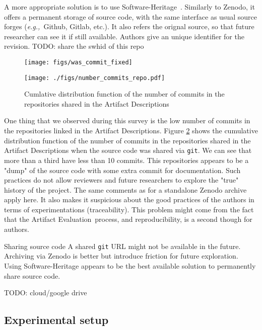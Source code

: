 \documentclass[sigconf]{acmart}
\newcommand{\eg}{\emph{e.g.,}}
\newcommand{\ad}{Artifact Description}
\newcommand{\aeval}{Artifact Evaluation}
\newcommand{\todo}[1]{{\color{red}TODO: #1}}
\begin{document}
A more appropriate solution is to use Software-Heritage\ \cite{swheritage, di2017software}.
Similarly to Zenodo, it offers a permanent storage of source code, with the same interface as usual source forges (\eg\ Github, Gitlab, etc.).
It also refers the orignal source, so that future researcher can see it if still available.
Authors give an unique identifier for the revision. 
\todo{share the swhid of this repo}



\begin{figure}
  \centering
  \texttt{[image: figs/was\_commit\_fixed]}
  \caption{}\label{fig:was_commit_fixed}
\end{figure}

\begin{figure}
  \centering
  \texttt{[image: ./figs/number\_commits\_repo.pdf]}
  \caption{Cumlative distribution function of the number of commits in the repositories shared in the \ad s}\label{fig:number_commits_repo}
\end{figure}

One thing that we observed during this survey is the low number of commits in the repositories linked in the \ad s.
Figure \ref{fig:number_commits_repo} shows the cumulative distribution function of the number of commits in the repositories shared in the \ad s when the source code was shared via \texttt{git}.
We can see that more than a third have less than 10 commits.
This repositories appears to be a "dump" of the source code with some extra commit for documentation.
Such practices do not allow reviewers and future researchers to explore the "true" history of the project.
The same comments as for a standalone Zenodo archive apply here.
It also makes it suspicious about the good practices of the authors in terms of experimentations (traceability).
This problem might come from the fact that the \aeval\ process, and reproducibility, is a second though for authors.

\begin{lesson}{Sharing source code}{}
  A shared \texttt{git} URL might not be available in the future.
  Archiving via Zenodo is better but introduce friction for future exploration.
  Using Software-Heritage appears to be the best available solution to permanently share source code.
\end{lesson}

\todo{cloud/google drive}

\subsection{Experimental setup}\label{sec:sop:expe}
\end{document}
